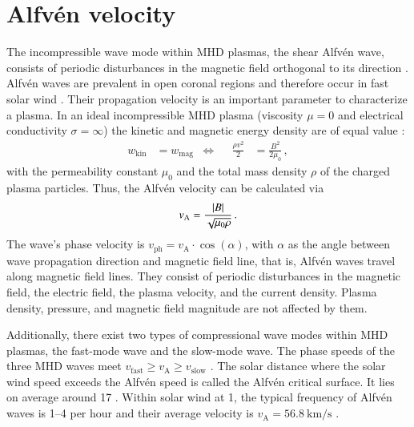 

\section{Alfvén velocity}
\label{sec:alfvén_velocity}
The incompressible wave mode within MHD plasmas, the shear Alfvén wave, consists of periodic disturbances in the magnetic field orthogonal to its direction \citep{Alfven1942}. Alfvén waves are prevalent in open coronal regions and therefore occur in fast solar wind \citep{Cranmer2005}. Their propagation velocity is an important parameter to characterize a plasma. In an ideal incompressible MHD plasma (viscosity $\mu = 0$ and electrical conductivity $\sigma = \infty$) the kinetic and magnetic energy density are of equal value \citep[p.~51]{Kivelson1995}: 
\begin{align*}
	w_\text{kin} &= w_\text{mag}	& \Longleftrightarrow	&	&	\frac{\rho v^2}{2} &= \frac{B^2}{2 \mu_0}	\,,
\end{align*}
with the permeability constant $\mu_0$ and the total mass density $\rho$ of the charged plasma particles. Thus, the Alfvén velocity can be calculated via
\begin{align}
	v_\text{A} = \frac{|B|}{\sqrt{\mu_0 \rho}}	\text{\,.}
\end{align}
The wave's phase velocity is $v_\text{ph} = v_\text{A} \cdot \cos(\alpha)$, with $\alpha$ as the angle between wave propagation direction and magnetic field line, that is, Alfvén waves travel along magnetic field lines. They consist of periodic disturbances in the magnetic field, the electric field, the plasma velocity, and the current density. Plasma density, pressure, and magnetic field magnitude are not affected by them.

Additionally, there exist two types of compressional wave modes within MHD plasmas, the fast-mode wave and the slow-mode wave. The phase speeds of the three MHD waves meet $v_\text{fast} \geq v_\text{A} \geq v_\text{slow}$ \citep[p.~52]{Kivelson1995}. The solar distance where the solar wind speed exceeds the Alfvén speed is called the Alfvén critical surface. It lies on average around \SI{17}{\Rs} \citep{Sittler1999,Exarhos2000}. Within solar wind at \SI{1}{\au}, the typical frequency of Alfvén waves is 1--4 per hour and their average velocity is $v_\text{A} = \SI{56.8}{\km\per\s}$ \citep{Veselovsky2010}.	%

